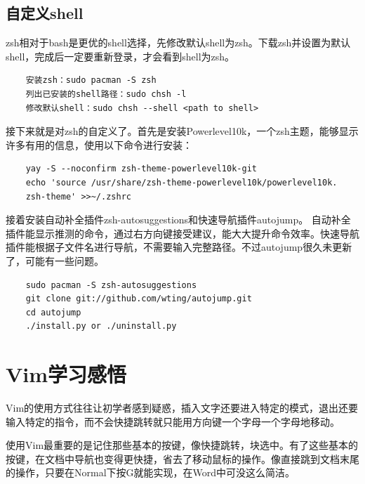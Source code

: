\documentclass[fontset=ubuntu]{ctexart}
\begin{document}
\begin{sloppypar}
\subsection{自定义shell}
zsh相对于bash是更优的shell选择，先修改默认shell为zsh。下载zsh并设置为默认shell，完成后一定要重新登录，才会看到shell为zsh。
\begin{listing}[htb]
    \begin{verbatim}
    安装zsh：sudo pacman -S zsh
    列出已安装的shell路径：sudo chsh -l
    修改默认shell：sudo chsh --shell <path to shell>
    \end{verbatim}
\end{listing}

接下来就是对zsh的自定义了。首先是安装Powerlevel10k，一个zsh主题，能够显示许多有用的信息，使用以下命令进行安装：
\begin{listing}[htb]
    \begin{verbatim}
    yay -S --noconfirm zsh-theme-powerlevel10k-git
    echo 'source /usr/share/zsh-theme-powerlevel10k/powerlevel10k.
    zsh-theme' >>~/.zshrc
    \end{verbatim}
\end{listing}

接着安装自动补全插件zsh-autosuggestions和快速导航插件autojump。
自动补全插件能显示推测的命令，通过右方向键接受建议，能大大提升命令效率。快速导航插件能根据子文件名进行导航，不需要输入完整路径。不过autojump很久未更新了，可能有一些问题。
\begin{listing}[htb]
    \begin{verbatim}
    sudo pacman -S zsh-autosuggestions
    git clone git://github.com/wting/autojump.git
    cd autojump
    ./install.py or ./uninstall.py
    \end{verbatim}
\end{listing}

\section{Vim学习感悟}
Vim的使用方式往往让初学者感到疑惑，插入文字还要进入特定的模式，退出还要输入特定的指令，而不会快捷跳转就只能用方向键一个字母一个字母地移动。

使用Vim最重要的是记住那些基本的按键，像快捷跳转，块选中。有了这些基本的按键，在文档中导航也变得更快捷，省去了移动鼠标的操作。像直接跳到文档末尾的操作，只要在Normal下按G就能实现，在Word中可没这么简洁。


\end{sloppypar}
\end{document}
